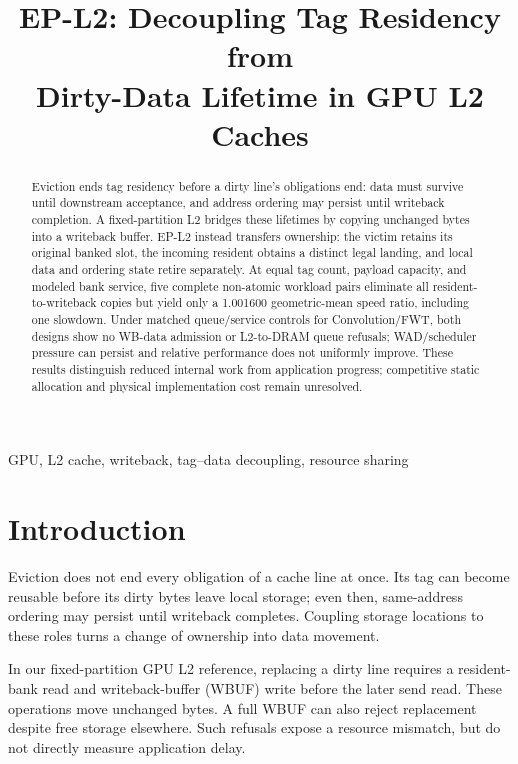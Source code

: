 \documentclass[conference,letterpaper]{IEEEtran}
\begin{document}
\title{EP-L2: Decoupling Tag Residency from\\Dirty-Data Lifetime in GPU L2 Caches}
\author{}
\maketitle
\begin{abstract}
Eviction ends tag residency before a dirty line's obligations end: data must survive until downstream acceptance, and address ordering may persist until writeback completion. A fixed-partition L2 bridges these lifetimes by copying unchanged bytes into a writeback buffer. EP-L2 instead transfers ownership: the victim retains its original banked slot, the incoming resident obtains a distinct legal landing, and local data and ordering state retire separately. At equal tag count, payload capacity, and modeled bank service, five complete non-atomic workload pairs eliminate all resident-to-writeback copies but yield only a 1.001600 geometric-mean speed ratio, including one slowdown. Under matched queue/service controls for Convolution/FWT, both designs show no WB-data admission or L2-to-DRAM queue refusals; WAD/scheduler pressure can persist and relative performance does not uniformly improve. These results distinguish reduced internal work from application progress; competitive static allocation and physical implementation cost remain unresolved.
\end{abstract}

\begin{IEEEkeywords}
GPU, L2 cache, writeback, tag--data decoupling, resource sharing
\end{IEEEkeywords}

\section{Introduction}
Eviction does not end every obligation of a cache line at once. Its tag can become reusable before its dirty bytes leave local storage; even then, same-address ordering may persist until writeback completes. Coupling storage locations to these roles turns a change of ownership into data movement.

In our fixed-partition GPU L2 reference, replacing a dirty line requires a resident-bank read and writeback-buffer (WBUF) write before the later send read. These operations move unchanged bytes. A full WBUF can also reject replacement despite free storage elsewhere. Such refusals expose a resource mismatch, but do not directly measure application delay.
\end{document}

